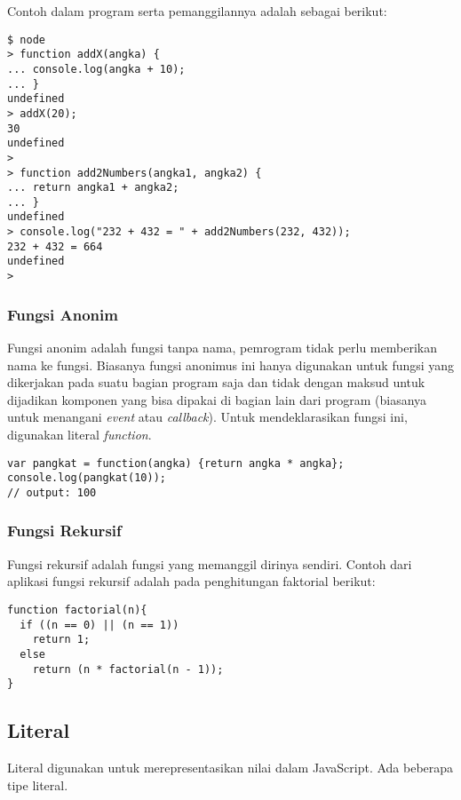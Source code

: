 Contoh dalam program serta pemanggilannya adalah sebagai berikut:

\lstset{language=bash,caption=Contoh deklarasi fungsi dan pemanggilannya}
\begin{lstlisting}
$ node
> function addX(angka) {
... console.log(angka + 10);
... }
undefined
> addX(20);
30
undefined
>
> function add2Numbers(angka1, angka2) {
... return angka1 + angka2;
... }
undefined
> console.log("232 + 432 = " + add2Numbers(232, 432));
232 + 432 = 664
undefined
>
\end{lstlisting}

\subsubsection{Fungsi Anonim}

Fungsi anonim adalah fungsi tanpa nama, pemrogram tidak perlu memberikan nama ke fungsi. Biasanya fungsi anonimus ini hanya digunakan untuk fungsi yang dikerjakan pada suatu bagian program saja dan tidak dengan maksud untuk dijadikan komponen yang bisa dipakai di bagian lain dari program (biasanya untuk menangani \textit{event} atau \textit{callback}). Untuk mendeklarasikan fungsi ini, digunakan literal \textit{function}.

\lstset{language=JavaScript,caption=Fungsi anonim}
\begin{lstlisting}
var pangkat = function(angka) {return angka * angka};
console.log(pangkat(10));
// output: 100
\end{lstlisting}

\subsubsection{Fungsi Rekursif}

Fungsi rekursif adalah fungsi yang memanggil dirinya sendiri. Contoh dari aplikasi fungsi rekursif adalah pada penghitungan faktorial berikut:

\lstset{language=JavaScript,caption=Fungsi rekursif untuk menghitung faktorial}
\begin{lstlisting}
function factorial(n){
  if ((n == 0) || (n == 1))
    return 1;
  else
    return (n * factorial(n - 1));
}
\end{lstlisting}

\subsection{Literal}

Literal digunakan untuk merepresentasikan nilai dalam JavaScript. Ada beberapa tipe literal.

